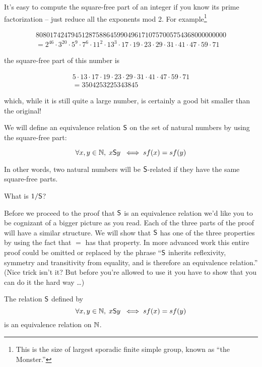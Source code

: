 It's easy to compute the square-free part of an integer if you know its prime factorization
-- just reduce all the exponents mod 2.  For example\footnote{This is the size of largest 
sporadic finite simple group, known as ``the Monster.''}

\begin{gather*} 
808017424794512875886459904961710757005754368000000000 \\ 
 = 2^{46}\cdot 3^{20}\cdot 5^9\cdot7^6\cdot 11^2\cdot 13^3\cdot 17
\cdot 19\cdot 23\cdot 29\cdot 31\cdot 41\cdot 47\cdot 59\cdot 71
\end{gather*}

\noindent the square-free part of this number is 

\begin{gather*} 
5\cdot 13\cdot 17\cdot 19\cdot 23\cdot 29\cdot 31\cdot 41\cdot 47\cdot 59\cdot 71\\
 = 3504253225343845
\end{gather*}

\noindent which, while it is still quite a large number, is certainly a good
bit smaller than the original!

We will define an equivalence relation $\mbox{\textsf S}$ on the set of natural numbers
by using the square-free part:  

\[ \forall x, y \in {\mathbb N}, \; x \mbox{\textsf S} y \; \iff sf(x) = sf(y) \]

In other words, two natural numbers will be $\mbox{\textsf S}$-related if they have the
same square-free parts.

\begin{exer}
What is $1/\mbox{\textsf S}$?
\end{exer}

Before we proceed to the proof that $\mbox{\textsf S}$ is an equivalence relation we'd like 
you to be cognizant of a bigger picture as you read.  Each of the three parts of
the proof will have a similar structure.  We will show that $\mbox{\textsf S}$ has one of the 
three properties by using the fact that $=$ has that property.  In more advanced
work this entire proof could be omitted or replaced by the phrase ``$\mbox{\textsf S}$ inherits
reflexivity, symmetry and transitivity from equality, and is therefore an equivalence
relation.''  (Nice trick isn't it?  But before you're allowed to use it you have
to show that you can do it the hard way \ldots)

\begin{thm} 
The relation $\mbox{\textsf S}$ defined by
\[ \forall x, y \in {\mathbb N}, \; x \mbox{\textsf S} y \; \iff sf(x) = sf(y) \]
\noindent is an equivalence relation on ${\mathbb N}$.
\end{thm}

